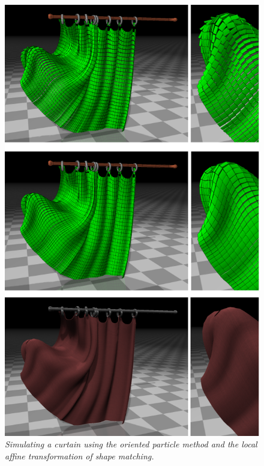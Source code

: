 \documentclass[
	11pt, 
	DIV10,
	a4paper, 
	oneside, 
	headings=normal, 
	captions=tableheading,
	final, 
	numbers=noenddot
]{scrartcl}
\begin{document}
	\begin{figure}
		\centering
		\includegraphics[scale = 0.34]{Curtain.PNG}
		\caption[caption]{\label{Curtain} \textit{Simulating a curtain using the oriented particle method and the local affine transformation of shape matching.} \footnotemark[1]}
	\end{figure}
\end{document}
